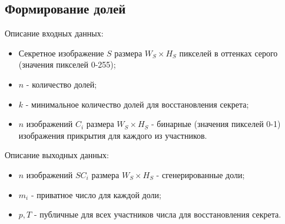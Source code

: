 \documentclass[a4paper,article,14pt]{extarticle}
\begin{document}
\subsection{Формирование долей}
Описание входных данных:

\begin{itemize}
    \setlength{\itemindent}{3em}
    \item Секретное изображение $S$ размера $W_S \times H_S$ пикселей в оттенках серого (значения пикселей 0-255);
    \item $n$ - количество долей;
    \item $k$ - минимальное количество долей для восстановления секрета;
    \item $n$ изображений $C_i$ размера $W_S \times H_S$ - бинарные (значения пикселей 0-1) изображения прикрытия для каждого из участников.
\end{itemize}

Описание выходных данных:

\begin{itemize}
    \setlength{\itemindent}{3em}
    \item $n$ изображений $SC_i$ размера $W_S \times H_S$ - сгенерированные доли;
    \item $m_i$ - приватное число для каждой доли;
    \item $p, T$ - публичные для всех участников числа для восстановления секрета.
\end{itemize}
\end{document}
